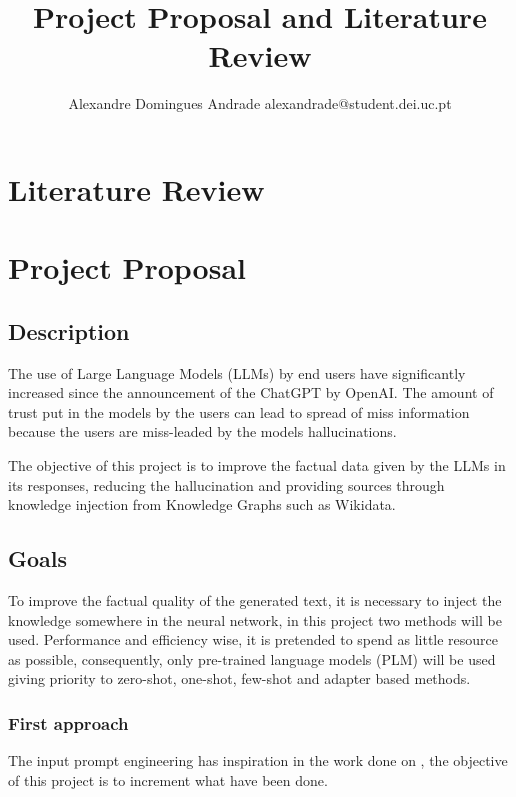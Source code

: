 \documentclass{article}
\title{Project Proposal and Literature Review}
\author{
    Alexandre Domingues Andrade
    \emails
    alexandrade@student.dei.uc.pt
}
\begin{document}
\maketitle

\section{Literature Review}

\section{Project Proposal}

\subsection{Description}

The use of Large Language Models (LLMs) by end users have significantly increased since the announcement of the ChatGPT by OpenAI. The amount of trust put in the models by the users can lead to spread of miss information because the users are miss-leaded by the models hallucinations.

The objective of this project is to improve the factual data given by the LLMs in its responses, reducing the hallucination and providing sources through knowledge injection from Knowledge Graphs such as Wikidata.

\subsection{Goals}

To improve the factual quality of the generated text, it is necessary to inject the knowledge somewhere in the neural network, in this project two methods will be used. Performance and efficiency wise, it is pretended to spend as little resource as possible, consequently, only pre-trained language models (PLM) will be used giving priority to zero-shot, one-shot, few-shot and adapter based methods.

\subsubsection{First approach}

The input prompt engineering has inspiration in the work done on \cite{baek2023knowledgeaugmentedlanguagemodelprompting}, the objective of this project is to increment what have been done.
\end{document}
